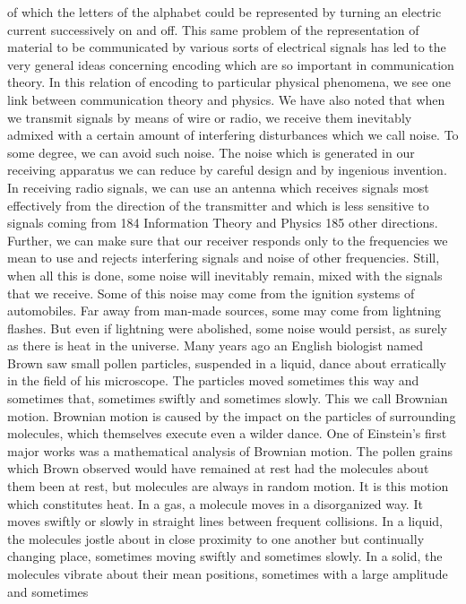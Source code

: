 {{{{{{{{{{{of which the letters of the alphabet could be represented by turning
an electric current successively on and off. This same problem of
the representation of material to be communicated by various sorts
of electrical signals has led to the very general ideas concerning
encoding which are so important in communication theory. In this
relation of encoding to particular physical phenomena, we see one
link between communication theory and physics.
We have also noted that when we transmit signals by means of
wire or radio, we receive them inevitably admixed with a certain
amount of interfering disturbances which we call noise. To some
degree, we can avoid such noise. The noise which is generated in
our receiving apparatus we can reduce by careful design and by
ingenious invention. In receiving radio signals, we can use an
antenna which receives signals most effectively from the direction
of the transmitter and which is less sensitive to signals coming from
184
Information Theory and Physics 185
other directions. Further, we can make sure that our receiver
responds only to the frequencies we mean to use and rejects interfering
signals and noise of other frequencies.
Still, when all this is done, some noise will inevitably remain,
mixed with the signals that we receive. Some of this noise may
come from the ignition systems of automobiles. Far away from
man-made sources, some may come from lightning flashes. But
even if lightning were abolished, some noise would persist, as
surely as there is heat in the universe.
Many years ago an English biologist named Brown saw small
pollen particles, suspended in a liquid, dance about erratically in
the field of his microscope. The particles moved sometimes this way
and sometimes that, sometimes swiftly and sometimes slowly. This
we call Brownian motion. Brownian motion is caused by the impact
on the particles of surrounding molecules, which themselves
execute even a wilder dance. One of Einstein’s first major works
was a mathematical analysis of Brownian motion.
The pollen grains which Brown observed would have remained
at rest had the molecules about them been at rest, but molecules
are always in random motion. It is this motion which constitutes
heat. In a gas, a molecule moves in a disorganized way. It moves
swiftly or slowly in straight lines between frequent collisions. In
a liquid, the molecules jostle about in close proximity to one
another but continually changing place, sometimes moving swiftly
and sometimes slowly. In a solid, the molecules vibrate about their
mean positions, sometimes with a large amplitude and sometimes
}}}}}}}}}}}
